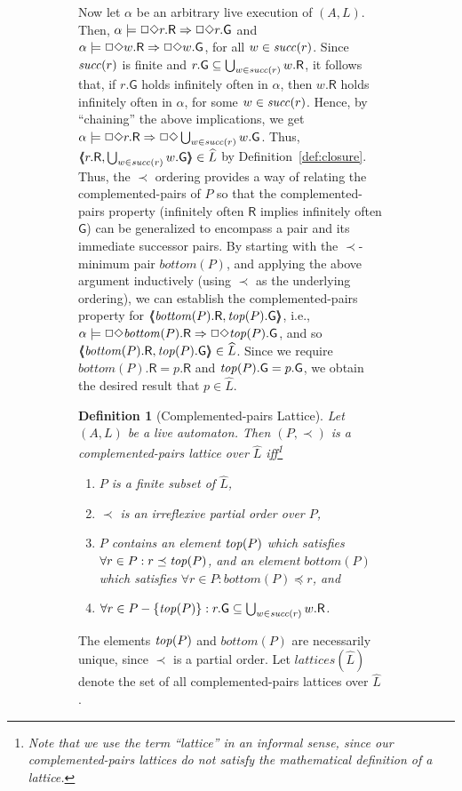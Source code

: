 \documentclass[11pt]{article}
\newcommand{\bn}{\begin{enumerate}}
\newcommand{\en}{\end{enumerate}}
\newcommand{\bd}{\begin{definition}}
\newcommand{\ed}{\end{definition}}
\newcommand{\intrdef}{\emph}	\newcommand{\intr}{\emph}
\newcommand{\UN}{\bigcup}
\newcommand{\fa}{\forall}
\newcommand{\sat}{\models}
\newcommand{\G}{\mathsf{G}}
\newcommand{\R}{\mathsf{R}}
\newcommand{\pair}[2]{\lpb #1, #2 \rpb}
\newcommand{\lpb}{\langle \hspace{-0.34em} \langle \hspace{-0.34em} \langle}
\newcommand{\rpb}{\rangle \hspace{-0.34em} \rangle \hspace{-0.34em} \rangle}
\newcommand{\al}{\alpha}
\newcommand{\bottom}{\mathit{bottom}}
\newcommand{\clos}[1]{\widehat{{#1}}}	\newcommand{\esig}{\mathit{esig}}
\newcommand{\lattices}{\mathit{lattices}}
\newcommand{\lprec}{\prec}
\newcommand{\lpreceq}{\preceq}
\newcommand{\iof}{\Box \Diamond}
\newtheorem{definition}{Definition}
\begin{document}
\begin{figure}[htb]
\begin{figure}[htb]
Now let $\al$ be an arbitrary live execution of $(A,L)$. Then, $\al \sat \iof r.\R
\imp \iof r.\G$ and $\al \sat \iof w.\R \imp \iof w.\G$, for all $w \in
\mathit{succ}(r)$.  Since $\mathit{succ}(r)$ is finite and $r.\G \sub \UN_{w \in \suc(r)} w.\R$, 
it follows that, if $r.\G$ holds
infinitely often in $\al$, then $w.\R$ holds infinitely often in
$\al$, for some $w \in \mathit{succ}(r)$.  Hence, by ``chaining'' the above implications,
we get  $\al \sat \iof r.\R \imp \iof \UN_{w \in \suc(r)} w.\G$.
Thus, $\pair{r.\R}{\UN_{w \in \suc(r)} w.\G} \in \clos{L}$ by Definition~\ref{def:closure}.
Thus, the
$\lprec$ ordering provides a way of relating the complemented-pairs of
$P$ so that the complemented-pairs property (infinitely often $\R$
implies infinitely often $\G$) can be generalized to encompass a pair
and its immediate successor pairs.  By starting with the
$\lprec$-minimum pair $\bottom(P)$, and applying the above argument
inductively (using $\lprec$ as the underlying ordering), we can
establish the complemented-pairs property for 
$\pair{\bottom(P).\R}{\topp(P).\G}$, i.e., $\al \sat \iof \bottom(P).\R \imp \iof
\topp(P).\G$, and so $\pair{\bottom(P).\R}{\topp(P).\G} \in \clos{L}$.
Since we require $\bottom(P).\R = p.\R$ and $\topp(P).\G = p.\G$, we obtain the
desired result that $p \in \clos{L}$.



\bd[Complemented-pairs Lattice]
Let $(A,L)$ be a live automaton.
Then $(P, \lprec)$ is a 
\intrdef{complemented-pairs lattice over $\clos{L}$} iff\/\footnote{Note that we use the
term ``lattice'' in an informal sense, since our complemented-pairs lattices
do not satisfy the mathematical definition of a lattice.}
\bn
   \item $P$ is a finite subset of $\clos{L}$,

   \item $\lprec$ is an irreflexive partial order over $P$,

   \item $P$ contains an element $\mathit{top}(P)$ which satisfies
         	$\fa r \in P: r \lpreceq \topp(P)$,
	and an element $\bottom(P)$ which satisfies
		$\fa r \in P: \bottom(P) \lpreceq r$, and

   \item \label{def:lattice:succ}
         $\fa r \in P - \{\topp(P)\}: r.\G \subseteq \UN_{w \in \suc(r)} w.\R$.
\en
\label{def:lattice}
\ed

\noindent
The elements $\mathit{top}(P)$ and $\bottom(P)$ are necessarily unique, since
$\lprec$ is a partial order.
Let $\lattices(\clos{L})$ denote the set
of all complemented-pairs lattices over $\clos{L}$.




\end{figure}
\end{figure}
\end{document}
